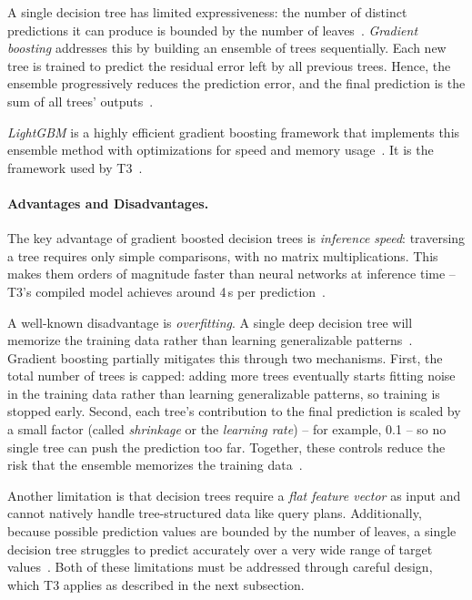 A single decision tree has limited expressiveness: the number of distinct predictions it can produce is bounded by the number of leaves~\parencite{cart}.
\emph{Gradient boosting} addresses this by building an ensemble of trees sequentially.
Each new tree is trained to predict the residual error left by all previous trees.
Hence, the ensemble progressively reduces the prediction error, and the final prediction is the sum of all trees' outputs~\parencite{gradientboosting}.

\emph{LightGBM} is a highly efficient gradient boosting framework that implements this ensemble method with optimizations for speed and memory usage~\parencite{lightgbm}.
It is the framework used by T3~\parencite{t3}.

\paragraph{Advantages and Disadvantages.}
The key advantage of gradient boosted decision trees is \emph{inference speed}: traversing a tree requires only simple comparisons, with no matrix multiplications.
This makes them orders of magnitude faster than neural networks at inference time -- T3's compiled model achieves around 4\,\textmu{}s per prediction~\parencite{t3}.

A well-known disadvantage is \emph{overfitting}.
A single deep decision tree will memorize the training data rather than learning generalizable patterns~\parencite{cart}.
Gradient boosting partially mitigates this through two mechanisms.
First, the total number of trees is capped: adding more trees eventually starts fitting noise in the training data rather than learning generalizable patterns, so training is stopped early.
Second, each tree's contribution to the final prediction is scaled by a small factor (called \emph{shrinkage} or the \emph{learning rate}) -- for example, 0.1 -- so no single tree can push the prediction too far.
Together, these controls reduce the risk that the ensemble memorizes the training data~\parencite{gradientboosting}.

Another limitation is that decision trees require a \emph{flat feature vector} as input and cannot natively handle tree-structured data like query plans.
Additionally, because possible prediction values are bounded by the number of leaves, a single decision tree struggles to predict accurately over a very wide range of target values~\parencite{t3}.
Both of these limitations must be addressed through careful design, which T3 applies as described in the next subsection.



